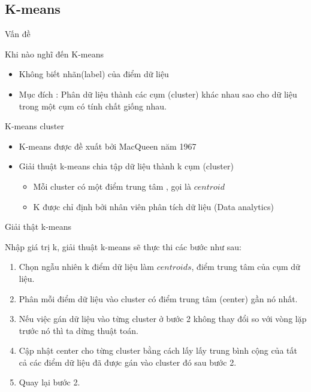 \documentclass[english,10pt,table]{beamer}
\begin{document}
\subsection{K-means}
\begin{frame}{Vấn đề}
	\begin{block} {Khi nào nghĩ đến K-means}
		\begin{itemize} \small
			\item Không biết nhãn(label) của điểm dữ liệu
			\item Mục đích : Phân dữ liệu thành các cụm (cluster) khác nhau sao cho dữ liệu trong một cụm có tính chất giống nhau.
		\end{itemize}
	\end{block}

	\begin{block}  {K-means cluster}
		\begin{itemize} \small
			\item K-means được đề xuất bởi MacQueen năm 1967
			\item Giải thuật k-means chia tập dữ liệu thành k cụm (cluster)
			\begin{itemize}
				\item Mỗi cluster có một điểm trung tâm , gọi là \alert{$centroid$}
				\item K được chỉ định bởi nhân viên phân tích dữ liệu (Data analytics)
			\end{itemize}
		\end{itemize}
	\end{block}

\end{frame}
\begin{frame} {Giải thật k-means}
	\begin{block}{Nhập giá trị k, giải thuật k-means sẽ thực thi các bước như sau:}
		\begin{enumerate}
				\item Chọn ngẫu nhiên k điểm dữ liệu làm \alert{$centroids$}, điểm trung tâm của cụm dữ liệu.
				\item Phân mỗi điểm dữ liệu vào cluster có điểm trung tâm (center) gần nó nhất.
				\item Nếu việc gán dữ liệu vào từng cluster ở bước 2 không thay đổi so với vòng lặp trước nó thì ta dừng thuật toán.
				\item Cập nhật center cho từng cluster bằng cách lấy lấy trung bình cộng của tất cả các điểm dữ liệu đã được gán vào cluster đó sau bước 2.
				\item Quay lại bước 2.
		\end{enumerate}
	\end{block}
\end{frame}
\end{document}
